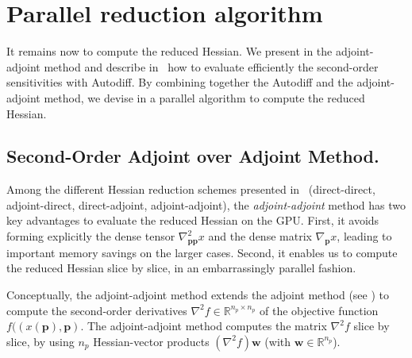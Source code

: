 \section{Parallel reduction algorithm}
It remains now to compute the reduced Hessian.
We present in 
the adjoint-adjoint method and describe in~
how to evaluate efficiently the second-order sensitivities with Autodiff. By combining together
the Autodiff and the adjoint-adjoint method, we devise in 
a parallel algorithm to compute the reduced Hessian.

\subsection{Second-Order Adjoint over Adjoint Method.}
\label{sec:reduction:soc}
Among the different Hessian reduction schemes presented in~\cite{papadimitriou2008direct} (direct-direct, adjoint-direct,
direct-adjoint, adjoint-adjoint), the \emph{adjoint-adjoint} method
has two key advantages to evaluate the reduced Hessian on the GPU.
First, it avoids forming explicitly the dense tensor $\nabla^2_{\bm{p}\bm{p}} x$
and the dense matrix $\nabla_{\bm{p}} x$, leading to important memory savings on the larger cases.
Second, it enables us to compute the reduced Hessian slice by slice, in an embarrassingly parallel
fashion.

Conceptually, the adjoint-adjoint method extends the adjoint method (see )
to compute the second-order derivatives $\nabla^2 f \in \mathbb{R}^{n_p\times n_p}$ of the
objective function $f((x(\bm{p}), \bm{p})$.
The adjoint-adjoint method computes the matrix $\nabla^2 f$ slice by slice,
by using $n_p$ Hessian-vector products $(\nabla^2 f) \bm{w}$ (with $\bm{w} \in \mathbb{R}^{n_p}$).

